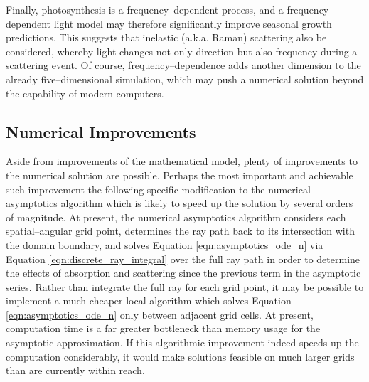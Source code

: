Finally, photosynthesis is a frequency--dependent process, and a frequency--dependent light model may therefore significantly improve seasonal growth predictions.
This suggests that inelastic (a.k.a. Raman) scattering \citep{raman} also be considered, whereby light changes not only direction but also frequency during a scattering event.
Of course, frequency--dependence adds another dimension to the already five--dimensional simulation, which may push a numerical solution beyond the capability of modern computers.

\subsection{Numerical Improvements}
Aside from improvements of the mathematical model, plenty of improvements to the numerical solution are possible.
Perhaps the most important and achievable such improvement the following specific modification to the numerical asymptotics algorithm which is likely to speed up the solution by several orders of magnitude.
At present, the numerical asymptotics algorithm considers each spatial--angular grid point, determines the ray path back to its intersection with the domain boundary, and solves Equation \eqref{eqn:asymptotics_ode_n} via Equation \eqref{eqn:discrete_ray_integral} over the full ray path in order to determine the effects of absorption and scattering since the previous term in the asymptotic series.
Rather than integrate the full ray for each grid point, it may be possible to implement a much cheaper local algorithm which solves Equation \eqref{eqn:asymptotics_ode_n} only between adjacent grid cells.
At present, computation time is a far greater bottleneck than memory usage for the asymptotic approximation.
If this algorithmic improvement indeed speeds up the computation considerably, it would make solutions feasible on much larger grids than are currently within reach.

